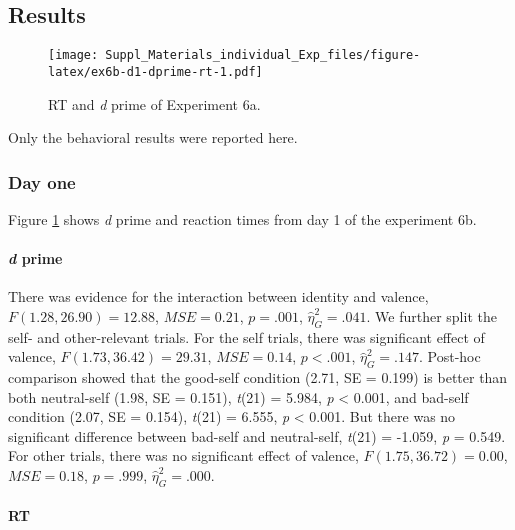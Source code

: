 \documentclass[
  english,
  man]{apa6}
\let\oldparagraph\paragraph
\renewcommand{\paragraph}[1]{\oldparagraph{#1}\mbox{}}
\begin{document}
\hypertarget{results-10}{%
\subsection{Results}\label{results-10}}

\begin{figure}
\centering
\texttt{[image: Suppl\_Materials\_individual\_Exp\_files/figure-latex/ex6b-d1-dprime-rt-1.pdf]}
\caption{\label{fig:ex6b-d1-dprime-rt}RT and \emph{d} prime of Experiment 6a.}
\end{figure}

Only the behavioral results were reported here.

\hypertarget{day-one}{%
\subsubsection{Day one}\label{day-one}}

Figure \ref{fig:ex6b-d1-dprime-rt} shows \emph{d} prime and reaction times from day 1 of the experiment 6b.

\hypertarget{d-prime-7}{%
\paragraph{\texorpdfstring{\emph{d} prime}{d prime}}\label{d-prime-7}}

There was evidence for the interaction between identity and valence, \(F(1.28, 26.90) = 12.88\), \(\mathit{MSE} = 0.21\), \(p = .001\), \(\hat{\eta}^2_G = .041\). We further split the self- and other-relevant trials. For the self trials, there was significant effect of valence, \(F(1.73, 36.42) = 29.31\), \(\mathit{MSE} = 0.14\), \(p < .001\), \(\hat{\eta}^2_G = .147\). Post-hoc comparison showed that the good-self condition (2.71, SE = 0.199) is better than both neutral-self (1.98, SE = 0.151), \emph{t}(21) = 5.984, \emph{p} \textless{} 0.001, and bad-self condition (2.07, SE = 0.154), \emph{t}(21) = 6.555, \emph{p} \textless{} 0.001. But there was no significant difference between bad-self and neutral-self, \emph{t}(21) = -1.059, \emph{p} = 0.549. For other trials, there was no significant effect of valence, \(F(1.75, 36.72) = 0.00\), \(\mathit{MSE} = 0.18\), \(p = .999\), \(\hat{\eta}^2_G = .000\).

\hypertarget{rt}{%
\paragraph{RT}\label{rt}}
\end{document}
